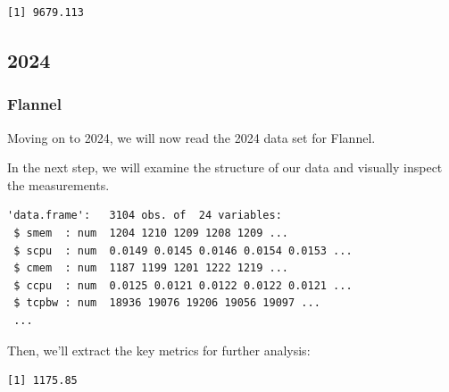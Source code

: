 \begin{verbatim}
[1] 9679.113
\end{verbatim}

\subsection{2024}

\subsubsection{Flannel}

Moving on to 2024, we will now read the 2024 data set for Flannel.

\begin{Shaded}
\begin{Highlighting}[]
\OtherTok{\textless{}{-}} 
\OtherTok{\textless{}{-}} \NormalTok{(}\NormalTok{,}\NormalTok{))}
\end{Highlighting}
\end{Shaded}

In the next step, we will examine the structure of our data and visually
inspect the measurements.

\begin{Shaded}
\begin{Highlighting}[]
\end{Highlighting}
\end{Shaded}

\begin{verbatim}
'data.frame':   3104 obs. of  24 variables:
 $ smem  : num  1204 1210 1209 1208 1209 ...
 $ scpu  : num  0.0149 0.0145 0.0146 0.0154 0.0153 ...
 $ cmem  : num  1187 1199 1201 1222 1219 ...
 $ ccpu  : num  0.0125 0.0121 0.0122 0.0122 0.0121 ...
 $ tcpbw : num  18936 19076 19206 19056 19097 ...
 ...
\end{verbatim}

Then, we'll extract the key metrics for further analysis:

\begin{Shaded}
\begin{Highlighting}[]
\SpecialCharTok{\$}
\end{Highlighting}
\end{Shaded}

\begin{verbatim}
[1] 1175.85
\end{verbatim}

